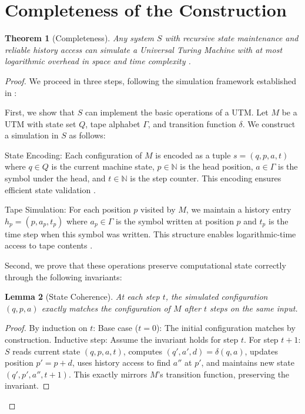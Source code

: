 \documentclass[12pt]{article}
\newtheorem{theorem}{Theorem}
\newtheorem{lemma}[theorem]{Lemma}
\begin{document}
\section{Completeness of the Construction}

\begin{theorem}[Completeness]
Any system $S$ with recursive state maintenance and reliable history access can simulate a Universal Turing Machine with at most logarithmic overhead in space and time complexity \cite{boyle2024memory,swamy1983space}.
\end{theorem}

\begin{proof}
We proceed in three steps, following the simulation framework established in \cite{swamy1983space}:

First, we show that $S$ can implement the basic operations of a UTM. Let $M$ be a UTM with state set $Q$, tape alphabet $\Gamma$, and transition function $\delta$. We construct a simulation in $S$ as follows:

State Encoding: Each configuration of $M$ is encoded as a tuple $s = (q, p, a, t)$ where $q \in Q$ is the current machine state, $p \in \mathbb{N}$ is the head position, $a \in \Gamma$ is the symbol under the head, and $t \in \mathbb{N}$ is the step counter. This encoding ensures efficient state validation \cite{boyle2024memory}.

Tape Simulation: For each position $p$ visited by $M$, we maintain a history entry $h_p = (p, a_p, t_p)$ where $a_p \in \Gamma$ is the symbol written at position $p$ and $t_p$ is the time step when this symbol was written. This structure enables logarithmic-time access to tape contents \cite{swamy1983space}.

Second, we prove that these operations preserve computational state correctly through the following invariants:

\begin{lemma}[State Coherence]
At each step $t$, the simulated configuration $(q, p, a)$ exactly matches the configuration of $M$ after $t$ steps on the same input.
\end{lemma}

\begin{proof}
By induction on $t$:
Base case ($t=0$): The initial configuration matches by construction.
Inductive step: Assume the invariant holds for step $t$. For step $t+1$: $S$ reads current state $(q, p, a, t)$, computes $(q', a', d) = \delta(q, a)$, updates position $p' = p + d$, uses history access to find $a''$ at $p'$, and maintains new state $(q', p', a'', t+1)$. This exactly mirrors $M$'s transition function, preserving the invariant.
\end{proof}


\end{proof}
\end{document}
